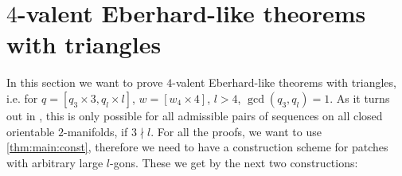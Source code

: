 \section{$4$-valent {\sc Eberhard}-like theorems with triangles}\label{sec:3:4}

In this section we want to prove $4$-valent {\sc Eberhard}-like theorems with triangles, i.e. for $q = [q_3 \times 3, q_l \times l]$, $w = [w_4 \times 4]$, $l > 4$, $\gcd(q_3, q_l) = 1$. As it turns out in \label{sec:negative:results}, this is only possible for all admissible pairs of sequences on all closed orientable $2$-manifolds, if $3 \nmid l$. For all the proofs, we want to use \autoref{thm:main:const}, therefore we need to have a construction scheme for patches with arbitrary large $l$-gons. These we get by the next two constructions:

